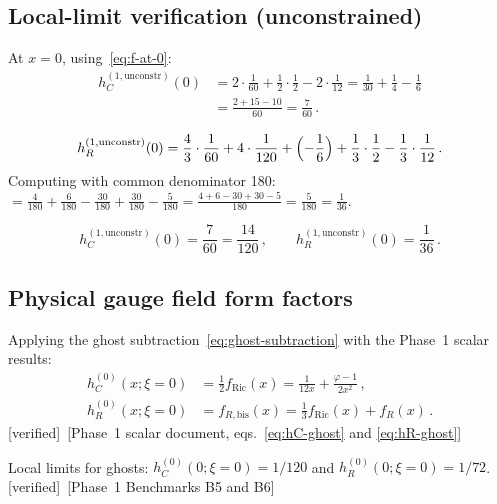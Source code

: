 \documentclass[12pt,a4paper]{article}
\theoremstyle{definition}
\theoremstyle{remark}
\newcommand{\fromlit}[1]{\textcolor{blue!70!black}{\textsf{[#1]}}}
\newcommand{\verified}{\textcolor{green!50!black}{\textsf{[verified]}}}
\begin{document}
\subsection{Local-limit verification (unconstrained)}

At $x = 0$, using~\eqref{eq:f-at-0}:
\begin{align}
  h_C^{(1,\mathrm{unconstr})}(0)
  &= 2\cdot\frac{1}{60} + \frac{1}{2}\cdot\frac{1}{2}
    - 2\cdot\frac{1}{12}
  = \frac{1}{30} + \frac{1}{4} - \frac{1}{6}
  \nonumber\\
  &= \frac{2 + 15 - 10}{60} = \frac{7}{60}\,.
  \label{eq:hC-unconstr-0}
\end{align}

\begin{equation}
  h_R^{(1,\mathrm{unconstr})}(0)
  = \frac{4}{3}\cdot\frac{1}{60} + 4\cdot\frac{1}{120}
  + \Bigl(-\frac{1}{6}\Bigr)
  + \frac{1}{3}\cdot\frac{1}{2}
  - \frac{1}{3}\cdot\frac{1}{12}\,.
  \label{eq:hR-unconstr-0-start}
\end{equation}
Computing with common denominator 180:
$= \frac{4}{180} + \frac{6}{180} - \frac{30}{180}
+ \frac{30}{180} - \frac{5}{180}
= \frac{4 + 6 - 30 + 30 - 5}{180}
= \frac{5}{180} = \frac{1}{36}$.

\begin{equation}
  \boxed{
  h_C^{(1,\mathrm{unconstr})}(0) = \frac{7}{60}
  = \frac{14}{120}\,,\qquad
  h_R^{(1,\mathrm{unconstr})}(0) = \frac{1}{36}\,.
  }
  \label{eq:unconstr-local-limits}
\end{equation}


\subsection{Physical gauge field form factors}

Applying the ghost subtraction~\eqref{eq:ghost-subtraction} with
the Phase~1 scalar results:
\begin{align}
  h_C^{(0)}(x;\xi=0) &= \frac{1}{2}f_{\mathrm{Ric}}(x)
  = \frac{1}{12x} + \frac{\varphi-1}{2x^2}\,,
  \label{eq:hC-ghost}\\
  h_R^{(0)}(x;\xi=0) &= f_{R,\mathrm{bis}}(x)
  = \frac{1}{3}f_{\mathrm{Ric}}(x) + f_R(x)\,.
  \label{eq:hR-ghost}
\end{align}
\verified\ \fromlit{Phase~1 scalar document,
eqs.~\eqref{eq:hC-ghost} and \eqref{eq:hR-ghost}}

Local limits for ghosts:
$h_C^{(0)}(0;\xi=0) = 1/120$ and
$h_R^{(0)}(0;\xi=0) = 1/72$.
\verified\ \fromlit{Phase~1 Benchmarks B5 and B6}
\end{document}
